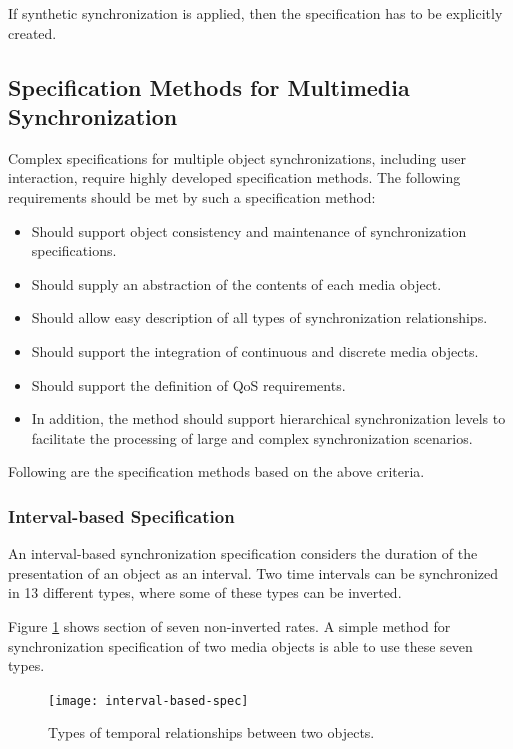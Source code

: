 If synthetic synchronization is applied, then the specification has to be explicitly created. 

\subsection*{Specification Methods for Multimedia Synchronization}
Complex specifications for multiple object synchronizations, including user interaction, require highly developed specification methods. The following requirements should be met by such a specification method:

\begin{multicols}{2}
	\begin{itemize}
		\item Should support object consistency and maintenance of synchronization specifications.
		\item Should supply an abstraction of the contents of each media object.	
		\item Should allow easy description of all types of synchronization relationships.
		\item Should support the integration of continuous and discrete media objects.
		\item Should support the definition of QoS requirements.
		\item In addition, the method should support hierarchical synchronization levels to facilitate the processing of large and complex synchronization scenarios.
	\end{itemize}
\end{multicols}

Following are the specification methods based on the above criteria.

\subsubsection{Interval-based Specification}
An interval-based synchronization specification considers the duration of the presentation of an object as an interval. Two time intervals can be synchronized in 13 different
types, where some of these types can be inverted. 

Figure \ref{fig:interval-based-spec} shows section of seven non-inverted rates. A simple method for synchronization specification of two media objects is able to use these seven types.


\begin{figure}[ht!]
	\centering
	\texttt{[image: interval-based-spec]}
	\caption{Types of temporal relationships between two objects.}
	\label{fig:interval-based-spec}
\end{figure}


